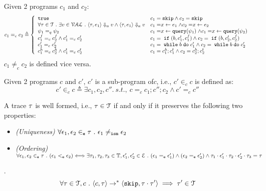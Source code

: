 \begin{defn}
%
\label{def:aq_prog}
Given 2 programs $c_1$ and $c_2$:
\[
c_1 =_{c} c_2
\triangleq 
\left\{
  \begin{array}{ll} 
    \etrue        
    & c_1 = \eskip \land c_2 = \eskip
    \\ 
    \forall \trace \in \mathcal{T} \st \exists v \in \mathcal{VAL}
    \st \config{ \trace, \expr_1} \aarrow v \land \config{ \trace, \expr_1} \aarrow v     
    & c_1 = \assign{x}{\expr_1} \land c_2 = \assign{x}{\expr_2} 
    \\ 
    \qexpr_1 =_{q} \qexpr_2       
    & c_1 = \assign{x}{\query(\qexpr_1)} \land c_1 = \assign{x}{\query(\qexpr_2)} 
    \\
    c_1^f =_{c} c_2^f \land c_1^t =_{c} c_2^t
    & c_1 = \eif(b, c_1^t, c_1^f) \land c_2 = \eif(b, c_2^t, c_2^f)
    \\ 
    c_1' =_{c} c_2'         
    & c_1 = \ewhile b \edo c_1' \land c_2 = \ewhile b \edo c_2'
    \\ 
    c_1^h =_{c} c_2^h \land c_1^t =_{c} c_2^t
    & c_1 = c_1^h;c_1^t \land c_2 = c_2^h;c_2^t 
  \end{array}
  \right.
\]
%
$c_1 \neq_{c} c_2$  is defined vice versa.
%
\end{defn}
%
Given 2 programs $c$ and $c'$, $c'$ is a sub-program of$c$, i.e., $c' \in_{c} c$ is defined as:
\begin{equation}
c' \in_{c} c \triangleq \exists c_1, c_2, c''. ~ s.t.,~
c =_{c} c_1; c''; c_2 \land c' =_{c} c''
\end{equation} 
%
\begin{defn}
\label{def:wf_trace}
A trace $\mathtt{\tau}$ is well formed, i.e., $\mathtt{\tau} \in \mathcal{T}$ if and only if it preserves the following two properties:
\begin{itemize}
\item{\emph{(Uniqueness)}} 
$\forall \mathtt{\epsilon}_1, \mathtt{\epsilon}_2 \in_{\mathtt{e}} \mathtt{\tau} ~.~ \mathtt{\epsilon}_1 \neq_{\mathtt{ism}} \mathtt{\epsilon}_2$
%
\item{\emph{(Ordering)}} $\forall \mathtt{\epsilon}_1, \mathtt{\epsilon}_2 \in_{\mathtt{e}} \mathtt{\tau} ~.~ 
(\mathtt{\epsilon}_1 <_{\mathtt{e}} \mathtt{\epsilon}_2) \Longleftrightarrow
\exists \mathtt{\tau}_1, \mathtt{\tau}_2, \mathtt{\tau}_3 \in \mathbb{T},
 \mathtt{\epsilon}_1', \mathtt{\epsilon}_2' \in \mathcal{E} ~.~
(\mathtt{\epsilon}_1 =_{\mathtt{e}} \mathtt{\epsilon}_1') \land (\mathtt{\epsilon}_2 =_{\mathtt{e}} \mathtt{\epsilon}_2')
\land \mathtt{\tau}_1 \cdot \mathtt{\epsilon}_1' \cdot \mathtt{\tau}_2 \cdot \mathtt{\epsilon}_2' \cdot \mathtt{\tau}_3 = \mathtt{\tau}$
\end{itemize}
\end{defn}
%
%
\begin{thm}.
\label{thm:os_wf_trace}
\\
\[
\forall \mathtt{\tau} \in \mathcal{T}, c ~.~
\langle c, \mathtt{\tau} \rangle \to^{*} \langle \mathtt{skip}, \mathtt{\tau} \cdot \mathtt{\tau}' \rangle
\implies
\mathtt{\tau}' \in \mathcal{T}
\]
%
\end{thm}
